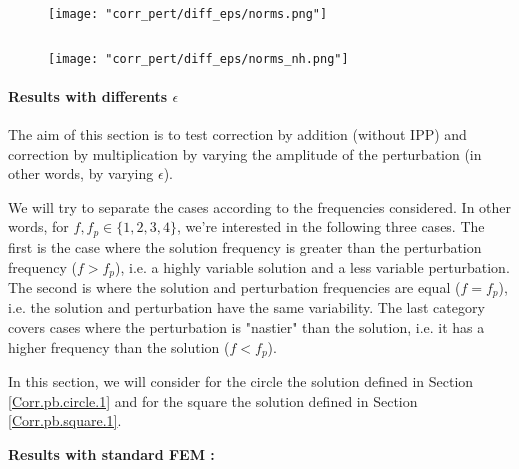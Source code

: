 \begin{minipage}{0.48\linewidth}
	\begin{figure}[H]
		\centering
		\texttt{[image: "corr\_pert/diff\_eps/norms.png"]}
		\label{norms}
	\end{figure} 
\end{minipage} $\qquad$
\begin{minipage}{0.48\linewidth}
	\begin{figure}[H]
		\centering
		\texttt{[image: "corr\_pert/diff\_eps/norms\_nh.png"]}
		\label{norms_nh}
	\end{figure} 
\end{minipage}


\paragraph{Results with differents $\epsilon$} \label{Corr.results.disturbed.eps} 

The aim of this section is to test correction by addition (without IPP) and correction by multiplication by varying the amplitude of the perturbation (in other words, by varying $\epsilon$). 

We will try to separate the cases according to the frequencies considered. In other words, for $f,f_p\in\{1,2,3,4\}$, we're interested in the following three cases. The first is the case where the solution frequency is greater than the perturbation frequency ($f>f_p$), i.e. a highly variable solution and a less variable perturbation. The second is where the solution and perturbation frequencies are equal ($f=f_p$), i.e. the solution and perturbation have the same variability. The last category covers cases where the perturbation is "nastier" than the solution, i.e. it has a higher frequency than the solution ($f<f_p$). 

In this section, we will consider for the circle the solution defined in Section \ref{Corr.pb.circle.1} and for the square the solution defined in Section \ref{Corr.pb.square.1}.

\textbf{Results with standard FEM :}

